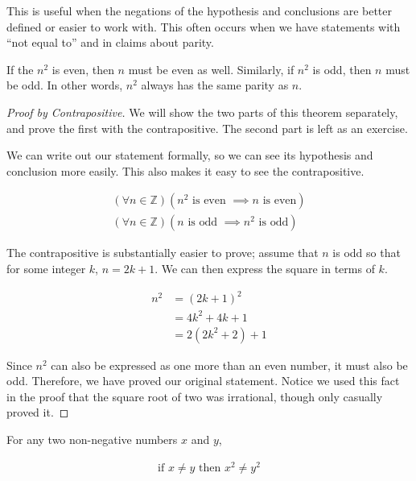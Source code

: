 This is useful when the negations of the hypothesis and conclusions are better defined or easier to work with. This often occurs when we have statements with ``not equal to'' and in claims about parity.

\vspace{\baselineskip}
\begin{theorem}
	If the $n^2$ is even, then $n$ must be even as well. Similarly, if $n^2$ is odd, then $n$ must be odd. In other words, $n^2$ always has the same parity as $n$.
\end{theorem}

\begin{proof}[Proof by Contrapositive]
	We will show the two parts of this theorem separately, and prove the first with the contrapositive. The second part is left as an exercise.
	
	We can write out our statement formally, so we can see its hypothesis and conclusion more easily. This also makes it easy to see the contrapositive.
	
	\begin{align*} 
		(\forall n \in \mathbb{Z})(n^2 \text{ is even } \implies n \text{ is even}) \\
		(\forall n \in \mathbb{Z})(n \text{ is odd } \implies n^2 \text{ is odd})
	\end{align*}
	
	The contrapositive is substantially easier to prove; assume that $n$ is odd so that for some integer $k$, $n = 2k + 1$. We can then express the square in terms of $k$.
	
	\begin{align*}
		n^2 &= (2k + 1)^2 \\
		&= 4k^2 + 4k + 1 \\
		&= 2(2k^2 + 2) + 1
	\end{align*}
	
	Since $n^2$ can also be expressed as one more than an even number, it must also be odd. Therefore, we have proved our original statement. Notice we used this fact in the proof that the square root of two was irrational, though only casually proved it.
\end{proof}

\vspace{\baselineskip}
\begin{theorem}
	For any two non-negative numbers $x$ and $y$,
	
	\begin{align*}
		\text{if } x \neq y \text{ then } x^2 \neq y^2
	\end{align*}
\end{theorem}

